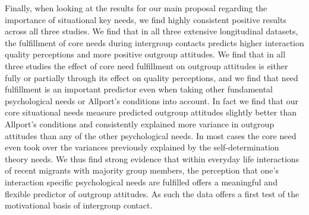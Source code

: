\documentclass[man, 12pt, a4paper]{apa7}
\theoremstyle{break}
\theoremstyle{plain}
\begin{document}
Finally, when looking at the results for our main proposal regarding the importance of situational key needs, we find highly consistent positive results across all three studies. We find that in all three extensive longitudinal datasets, the fulfillment of core needs during intergroup contacts predicts higher interaction quality perceptions and more positive outgroup attitudes. We find that in all three studies the effect of core need fulfillment on outgroup attitudes is either fully or partially through its effect on quality perceptions, and we find that need fulfillment is an important predictor even when taking other fundamental psychological needs or Allport's conditions into account. In fact we find that our core situational needs measure predicted outgroup attitudes slightly better than Allport's conditions and consistently explained more variance in outgroup attitudes than any of the other psychological needs. In most cases the core need even took over the variances previously explained by the self-determination theory needs. We thus find strong evidence that within everyday life interactions of recent migrants with majority group members, the perception that one's interaction specific psychological needs are fulfilled offers a meaningful and flexible predictor of outgroup attitudes. As such the data offers a first test of the motivational basis of intergroup contact.
\end{document}

